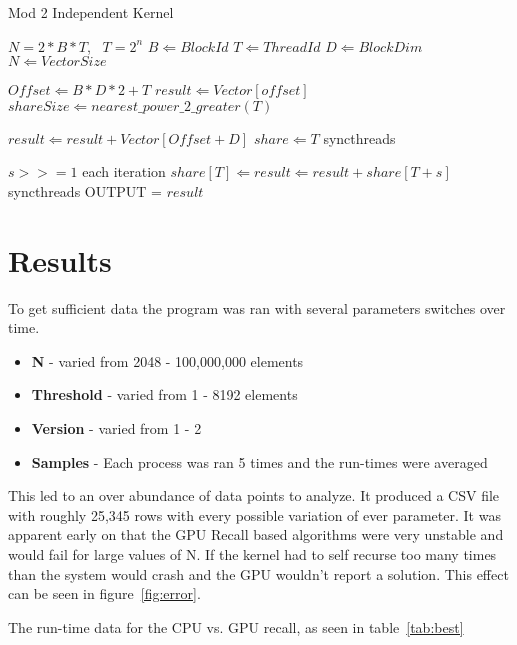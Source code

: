 \documentclass[conference]{IEEEtran}
\begin{document}
\begin{algorithm}
  \caption{Mod 2 Independent Kernel}
  \label{alg:mod2}
  \begin{algorithmic}
    \REQUIRE $N=2*B*T$,~ $T=2^n$
    \STATE $B \Leftarrow BlockId$
    \STATE $T \Leftarrow ThreadId$
    \STATE $D \Leftarrow BlockDim$
    \STATE $N \Leftarrow Vector Size$
    
    \STATE $Offset \Leftarrow B * D * 2 + T$
    \STATE $result \Leftarrow Vector[offset]$
    \STATE $shareSize \Leftarrow nearest\_power\_2\_greater(T)$
    
        \STATE $result \Leftarrow result + Vector[Offset + D]$
    \ENDIF
    \STATE $share \Leftarrow T$
    \STATE syncthreads
    
    \STATE $s >>= 1$ each iteration
            \STATE $share[T] \Leftarrow result \Leftarrow result + share[T + s]$
        \ENDIF
        \STATE syncthreads
    \ENDFOR
      \STATE OUTPUT = $result$
    \ENDIF
    \ENDFOR
  \end{algorithmic}
\end{algorithm}

\section{Results}
To get sufficient data the program was ran with several parameters switches over time. 
\begin{itemize}
  \item \textbf{N} - varied from 2048 - 100,000,000 elements
  \item \textbf{Threshold} - varied from 1 - 8192 elements
  \item \textbf{Version} - varied from 1 - 2
  \item \textbf{Samples} - Each process was ran 5 times and the run-times were averaged
\end{itemize}

This led to an over abundance of data points to analyze. It produced a CSV file with roughly 25,345 rows with every possible variation of ever parameter. It was apparent early on that the GPU Recall based algorithms were very unstable and would fail for large values of N. If the kernel had to self recurse too many times than the system would crash and the GPU wouldn't report a solution. This effect can be seen in figure~\ref{fig:error}.

The run-time data for the CPU vs. GPU recall, as seen in table~\ref{tab:best}
\end{document}
